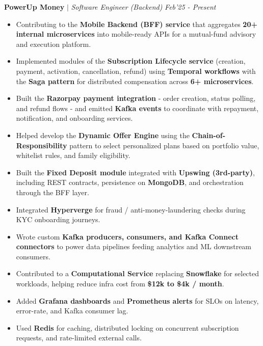\documentclass[9pt]{extarticle}
\begin{document}
\hspace{-1.5mm}\textbf{PowerUp Money} $|$ \textit{Software Engineer (Backend)} \hfill\hfill\textit{Feb'25 - Present}
\begin{itemize}
    \item Contributing to the \textbf{Mobile Backend (BFF) service} that aggregates \textbf{20+ internal microservices} into mobile-ready APIs for a mutual-fund advisory and execution platform.
    \item Implemented modules of the \textbf{Subscription Lifecycle service} (creation, payment, activation, cancellation, refund) using \textbf{Temporal workflows} with the \textbf{Saga pattern} for distributed compensation across \textbf{6+ microservices}.
    \item Built the \textbf{Razorpay payment integration} - order creation, status polling, and refund flows - and emitted \textbf{Kafka events} to coordinate with repayment, notification, and onboarding services.
    \item Helped develop the \textbf{Dynamic Offer Engine} using the \textbf{Chain-of-Responsibility} pattern to select personalized plans based on portfolio value, whitelist rules, and family eligibility.
    \item Built the \textbf{Fixed Deposit module} integrated with \textbf{Upswing (3rd-party)}, including REST contracts, persistence on \textbf{MongoDB}, and orchestration through the BFF layer.
    \item Integrated \textbf{Hyperverge} for fraud / anti-money-laundering checks during KYC onboarding journeys.
    \item Wrote custom \textbf{Kafka producers, consumers, and Kafka Connect connectors} to power data pipelines feeding analytics and ML downstream consumers.
    \item Contributed to a \textbf{Computational Service} replacing \textbf{Snowflake} for selected workloads, helping reduce infra cost from \textbf{\$12k to \$4k / month}.
    \item Added \textbf{Grafana dashboards} and \textbf{Prometheus alerts} for SLOs on latency, error-rate, and Kafka consumer lag.
    \item Used \textbf{Redis} for caching, distributed locking on concurrent subscription requests, and rate-limited external calls.
\end{itemize}
\end{document}
